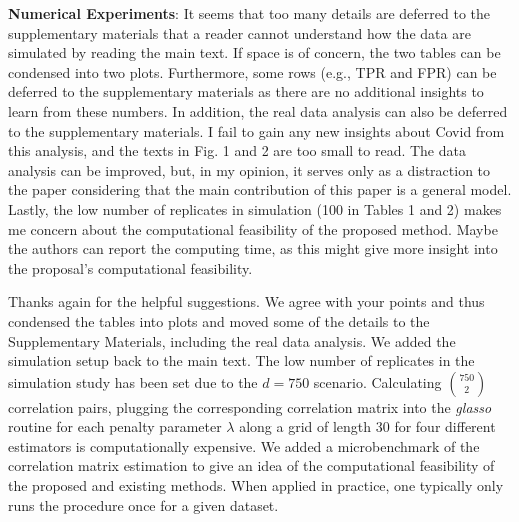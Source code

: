\begin{point}
    \textbf{Numerical Experiments}: It seems that too many details are deferred to the supplementary materials that a reader cannot understand how the data are simulated by reading the main text. If space is of concern, the two tables can be condensed into two plots. Furthermore, some rows (e.g., TPR and FPR) can be deferred to the supplementary materials as there are no additional insights to learn from these numbers. In addition, the real data analysis can also be deferred to the supplementary materials. I fail to gain any new insights about Covid from this analysis, and the texts in Fig. 1 and 2 are too small to read. The data analysis can be improved, but, in my opinion, it serves only as a distraction to the paper considering that the main contribution of this paper is a general model. Lastly, the low number of replicates in simulation (100 in Tables 1 and 2) makes me concern about the computational feasibility of the proposed method. Maybe the authors can report the computing time, as this might give more insight into the proposal’s computational feasibility.
\end{point}

\begin{reply}
    Thanks again for the helpful suggestions. We agree with your points and thus condensed the tables into plots and moved some of the details to the Supplementary Materials, including the real data analysis. We added the simulation setup back to the main text. The low number of replicates in the simulation study has been set due to the \(d=750\) scenario. Calculating \({750\choose 2}\) correlation pairs, plugging the corresponding correlation matrix into the \textit{glasso} routine for each penalty parameter \(\lambda\) along a grid of length 30 for four different estimators is computationally expensive. We added a microbenchmark of the correlation matrix estimation to give an idea of the computational feasibility of the proposed and existing methods. When applied in practice, one typically only runs the procedure once for a given dataset.
\end{reply}

